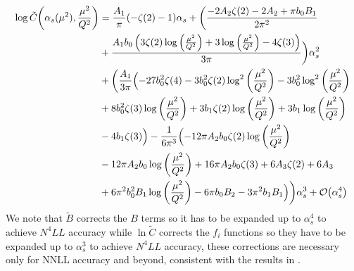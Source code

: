 \documentclass[../main.tex]{subfiles}
\begin{document}
\begin{align}
    \begin{split}
    \log \tilde{C}\qty(\alpha_s(\mu^2), \frac{\mu^2}{Q^2}) &= \frac{A_1}{\pi } (-\zeta (2)-1) \alpha_s + \biggl(\frac{-2 A_2 \zeta (2)-2 A_2+\pi  b_0 B_1}{2 \pi ^2}\\
    &+\frac{A_1 b_0 \left(3 \zeta (2) \log \left(\frac{\mu ^2}{Q^2}\right)+3 \log \left(\frac{\mu ^2}{Q^2}\right) -4 \zeta (3)\right)}{3 \pi }\biggr)\alpha_s^2\\
    &+\biggl(\frac{A_1}{3 \pi } \Bigl(-27 b_0^2 \zeta (4)-3 b_0^2 \zeta (2) \log ^2\left(\frac{\mu ^2}{Q^2}\right)-3 b_0^2 \log ^2\left(\frac{\mu ^2}{Q^2}\right)\\
    &+8 b_0^2 \zeta (3) \log \left(\frac{\mu ^2}{Q^2}\right)+3 b_1 \zeta (2) \log \left(\frac{\mu ^2}{Q^2}\right)+3 b_1 \log \left(\frac{\mu ^2}{Q^2}\right)\\
    &-4 b_1 \zeta (3)\Bigr)-\frac{1}{6 \pi ^3}\Bigl(-12 \pi  A_2 b_0 \zeta (2) \log \left(\frac{\mu ^2}{Q^2}\right)\\
    &-12 \pi  A_2 b_0 \log \left(\frac{\mu ^2}{Q^2}\right)+16 \pi  A_2 b_0 \zeta (3)+6 A_3 \zeta (2)+6 A_3\\
    &+6 \pi ^2 b_0^2 B_1 \log \left(\frac{\mu ^2}{Q^2}\right)-6 \pi  b_0 B_2 -3 \pi ^2 b_1 B_1\Bigr)\biggr)\alpha_s^3 + \order{\alpha_s^4}
    \end{split}
\end{align}
We note that $\tilde{B}$ corrects the $B$ terms so it has to be expanded up to $\alpha_s^4$ to achieve $N^4LL$ accuracy while
$\ln \tilde{C}$ corrects the $f_i$ functions so they have to be expanded up to $\alpha_s^3$ to achieve $N^4LL$ accuracy, 
these corrections are necessary only for NNLL accuracy and beyond, consistent with the results in \cite{CATANI19933}.
\end{document}
